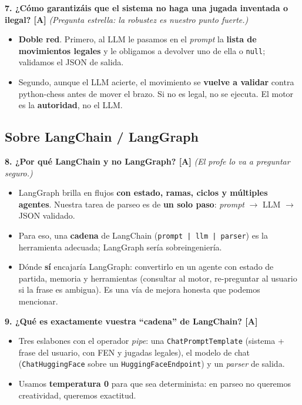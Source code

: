 \documentclass[11pt]{article}
\begin{document}
\textbf{7. ¿Cómo garantizáis que el sistema no haga una jugada inventada o
ilegal? [A]} \emph{(Pregunta estrella: la robustez es nuestro punto fuerte.)}
\begin{itemize}
    \item \textbf{Doble red}. Primero, al LLM le pasamos en el \textit{prompt}
          la \textbf{lista de movimientos legales} y le obligamos a devolver uno
          de ella o \texttt{null}; validamos el JSON de salida.
    \item Segundo, aunque el LLM acierte, el movimiento se \textbf{vuelve a
          validar} contra python-chess antes de mover el brazo. Si no es legal,
          no se ejecuta. El motor es la \textbf{autoridad}, no el LLM.
\end{itemize}

\subsection*{Sobre LangChain / LangGraph}

\textbf{8. ¿Por qué LangChain y no LangGraph? [A]} \emph{(El profe lo va a
preguntar seguro.)}
\begin{itemize}
    \item LangGraph brilla en flujos \textbf{con estado, ramas, ciclos y
          múltiples agentes}. Nuestra tarea de parseo es de \textbf{un solo
          paso}: \textit{prompt} $\rightarrow$ LLM $\rightarrow$ JSON validado.
    \item Para eso, una \textbf{cadena} de LangChain (\texttt{prompt | llm |
          parser}) es la herramienta adecuada; LangGraph sería sobreingeniería.
    \item Dónde \textbf{sí} encajaría LangGraph: convertirlo en un agente con
          estado de partida, memoria y herramientas (consultar al motor,
          re-preguntar al usuario si la frase es ambigua). Es una vía de mejora
          honesta que podemos mencionar.
\end{itemize}

\textbf{9. ¿Qué es exactamente vuestra ``cadena'' de LangChain? [A]}
\begin{itemize}
    \item Tres eslabones con el operador \textit{pipe}: una
          \texttt{ChatPromptTemplate} (sistema + frase del usuario, con FEN y
          jugadas legales), el modelo de chat (\texttt{ChatHuggingFace} sobre un
          \texttt{HuggingFaceEndpoint}) y un \textit{parser} de salida.
    \item Usamos \textbf{temperatura 0} para que sea determinista: en parseo no
          queremos creatividad, queremos exactitud.
\end{itemize}
\end{document}

